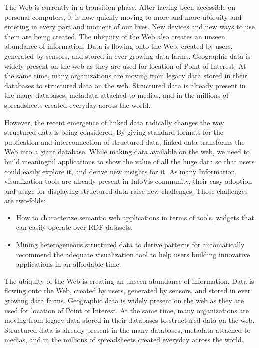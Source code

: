 The Web is currently in a transition phase. After having been accessible on personal computers, it is now 
quickly moving to more and more ubiquity and entering in every part and moment of our lives. New 
devices and new ways to use them are being created. The ubiquity of the Web also creates an unseen 
abundance of information. Data is flowing onto the Web, created by users, generated by sensors, and 
stored in ever growing data farms. Geographic data is widely present on the web as they are used for location 
of Point of Interest. At the same time, many organizations are moving from legacy data stored in their databases
to structured data on the web. Structured data is already present in the many databases, metadata attached to medias, and in the millions of spreadsheets created everyday across the world. 


However, the recent emergence of linked data radically changes the way structured data is being considered. By giving standard formats for the publication and interconnection of structured data, linked data transforms the Web into a giant database. While making data available on the web, we need to build meaningful applications to show the value of all the huge data so that users could easily explore it, and derive new insights for it. As many Information visualization tools are already present in InfoVis community, their easy adoption and usage for displaying structured data raise new challenges. Those challenges are two-folds:
\begin{itemize}
\item How to characterize semantic web applications in terms of tools, widgets that can easily operate over RDF datasets.
\item Mining heterogeneous structured data to derive patterns for automatically recommend the adequate visualization tool to help users building innovative applications in an affordable time.
\end{itemize}

The ubiquity of the Web is creating an unseen abundance of information. Data is flowing onto the Web, created by users, generated by sensors, and 
stored in ever growing data farms. Geographic data is widely present on the web as they are used for location of Point of Interest. At the same time, many organizations are moving from legacy data stored in their databases to structured data on the web. Structured data is already present in the many databases, metadata attached to medias, and in the millions of spreadsheets created everyday across the world. 

